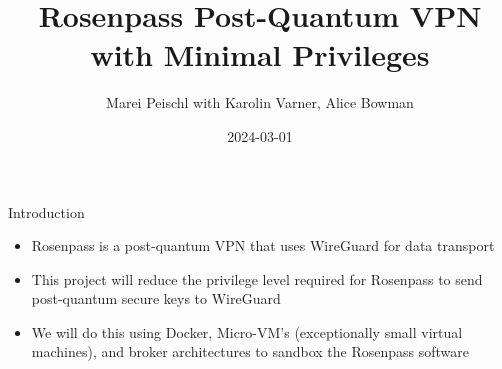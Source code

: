 \documentclass[english]{rosenpass-beamer}
\title{Rosenpass Post-Quantum VPN with Minimal Privileges}
\author{Marei Peischl with Karolin Varner, Alice Bowman}
\institute{\url{https://rosenpass.eu}}
\date{2024-03-01}
\begin{document}
\maketitle

\begin{frame}{Introduction}
\begin{itemize}
\item Rosenpass is a post-quantum VPN that uses WireGuard for data transport
\item This project will reduce the privilege level required for Rosenpass to send post-quantum secure keys to WireGuard
\item We will do this using Docker, Micro-VM’s (exceptionally small virtual machines), and broker architectures to sandbox the Rosenpass software
\end{itemize}
\end{frame}
\end{document}
